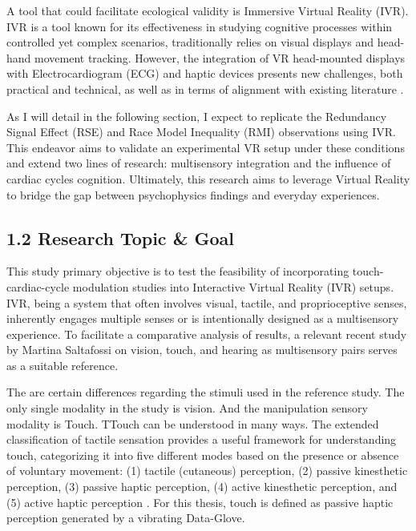 \documentclass[12pt,oneside,openright]{report}
\begin{document}
A tool that could facilitate ecological validity is Immersive Virtual Reality (IVR). IVR is a tool known for its effectiveness in studying cognitive processes within controlled yet complex scenarios, traditionally relies on visual displays and head-hand movement tracking. However, the integration of VR head-mounted displays with Electrocardiogram (ECG) and haptic devices presents new challenges, both practical and technical, as well as in terms of alignment with existing literature \parencite{Klotzsche2023}.

As I will detail in the following section, I expect to replicate the Redundancy Signal Effect (RSE) and Race Model Inequality (RMI) observations using IVR. This endeavor aims to validate an experimental VR setup under these conditions and extend two lines of research: multisensory integration and the influence of cardiac cycles cognition. Ultimately, this research aims to leverage Virtual Reality to bridge the gap between psychophysics findings and everyday experiences.

\subsection*{1.2 Research Topic \& Goal}

This study primary objective is to test the feasibility of incorporating touch-cardiac-cycle modulation studies into Interactive Virtual Reality (IVR) setups. IVR, being a system that often involves visual, tactile, and proprioceptive senses, inherently engages multiple senses or is intentionally designed as a multisensory experience. To facilitate a comparative analysis of results, a relevant recent study by Martina Saltafossi on vision, touch, and hearing as multisensory pairs \parencite{SALTAFOSSI2023108642} serves as a suitable reference.

The are certain differences regarding the stimuli used in the reference study. The only single modality in the study is vision. And the manipulation sensory modality is Touch. TTouch can be understood in many ways. The extended classification of tactile sensation provides a useful framework for understanding touch, categorizing it into five different modes based on the presence or absence of voluntary movement: (1) tactile (cutaneous) perception, (2) passive kinesthetic perception, (3) passive haptic perception, (4) active kinesthetic perception, and (5) active haptic perception \parencite{Healy2003HandbookOP}. For this thesis, touch is defined as passive haptic perception generated by a vibrating Data-Glove.
\end{document}
